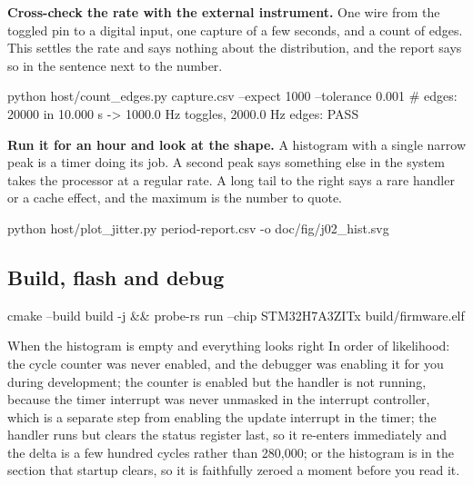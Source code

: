 \begin{steps}
\item \textbf{Cross-check the rate with the external instrument.} One wire from
the toggled pin to a digital input, one capture of a few seconds, and a count of
edges. This settles the rate and says nothing about the distribution, and the
report says so in the sentence next to the number.
\begin{shellcode}
python host/count_edges.py capture.csv --expect 1000 --tolerance 0.001
# edges: 20000 in 10.000 s -> 1000.0 Hz toggles, 2000.0 Hz edges: PASS
\end{shellcode}

\item \textbf{Run it for an hour and look at the shape.} A histogram with a
single narrow peak is a timer doing its job. A second peak says something else
in the system takes the processor at a regular rate. A long tail to the right
says a rare handler or a cache effect, and the maximum is the number to quote.
\begin{shellcode}
python host/plot_jitter.py period-report.csv -o doc/fig/j02_hist.svg
\end{shellcode}
\end{steps}


\subsection*{Build, flash and debug}


\begin{shellcode}
cmake --build build -j && probe-rs run --chip STM32H7A3ZITx build/firmware.elf
\end{shellcode}

\begin{note}{When the histogram is empty and everything looks right}
In order of likelihood: the cycle counter was never enabled, and the debugger
was enabling it for you during development; the counter is enabled but the
handler is not running, because the timer interrupt was never unmasked in the
interrupt controller, which is a separate step from enabling the update
interrupt in the timer; the handler runs but clears the status register last, so
it re-enters immediately and the delta is a few hundred cycles rather than
280,000; or the histogram is in the section that startup clears, so it is
faithfully zeroed a moment before you read it.
\end{note}

